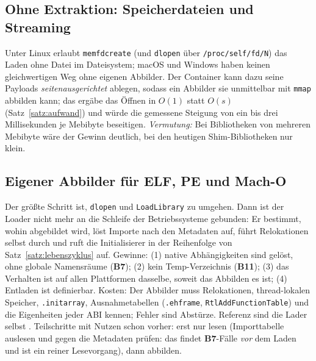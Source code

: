 \documentclass[a4paper,12pt,twoside]{report}
\DeclareRobustCommand{\_}{\ifmmode\mbox{\textunderscore}\else\textunderscore\allowbreak{}\fi}
\theoremstyle{definition}
\newcommand{\Bf}[1]{\textbf{B#1}}
\begin{document}
\subsection{Ohne Extraktion: Speicherdateien und Streaming}
Unter Linux erlaubt \texttt{memfd\_create} (und \texttt{dlopen} über \texttt{/proc/self/fd/N}) das Laden ohne Datei im Dateisystem; macOS und Windows haben keinen gleichwertigen Weg ohne eigenen Abbilder. Der Container kann dazu seine Payloads \emph{seitenausgerichtet} ablegen, sodass ein Abbilder sie unmittelbar mit \texttt{mmap} abbilden kann; das ergäbe das Öffnen in $O(1)$ statt $O(s)$ (Satz~\ref{satz:aufwand}) und würde die gemessene Steigung von ein bis drei Millisekunden je Mebibyte beseitigen. \emph{Vermutung:} Bei Bibliotheken von mehreren Mebibyte wäre der Gewinn deutlich, bei den heutigen Shim-Bibliotheken nur klein.

\subsection{Eigener Abbilder für ELF, PE und Mach-O}
\label{sec:aus_mapper}
Der größte Schritt ist, \texttt{dlopen} und \texttt{LoadLibrary} zu umgehen. Dann ist der Loader nicht mehr an die Schleife der Betriebssysteme gebunden: Er bestimmt, wohin abgebildet wird, löst Importe nach den Metadaten auf, führt Relokationen selbst durch und ruft die Initialisierer in der Reihenfolge von Satz~\ref{satz:lebenszyklus} auf. Gewinne: (1) native Abhängigkeiten sind gelöst, ohne globale Namensräume (\Bf{7}); (2) kein Temp-Verzeichnis (\Bf{11}); (3) das Verhalten ist auf allen Plattformen dasselbe, soweit das Abbilden es ist; (4) Entladen ist definierbar. Kosten: Der Abbilder muss Relokationen, thread-lokalen Speicher, \texttt{.init\_array}, Ausnahmetabellen (\texttt{.eh\_frame}, \texttt{RtlAddFunctionTable}) und die Eigenheiten jeder ABI kennen; Fehler sind Abstürze. Referenz sind die Lader selbst \cite{levine2000,drepper2011}. Teilschritte mit Nutzen schon vorher: erst nur lesen (Importtabelle auslesen und gegen die Metadaten prüfen: das findet \Bf{7}-Fälle \emph{vor} dem Laden und ist ein reiner Lesevorgang), dann abbilden.
\end{document}
